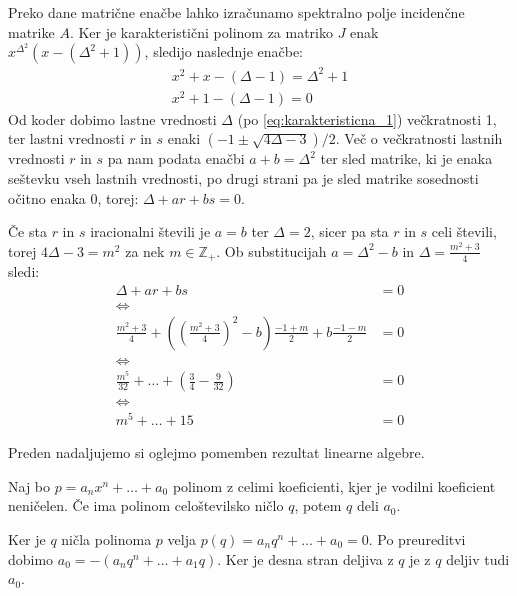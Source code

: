 \documentclass[fin1, tisk]{fmfdelo}
\newcommand{\ZZ}{\mathbb{Z}}
\begin{document}
Preko dane matrične enačbe lahko izračunamo spektralno polje incidenčne 
matrike $A$. Ker je karakteristični polinom za matriko $J$ enak 
$x^{\Delta^2}(x - (\Delta^2 + 1))$, sledijo naslednje enačbe:
\begin{align}
x^2 + x - (\Delta - 1) = \Delta^2 + 1 \label{eq:karakteristicna_1}\\ 
x^2 + 1 - (\Delta - 1) = 0 \label{eq:karakteristicna_2}
\end{align} 
Od koder dobimo lastne vrednosti $\Delta$ (po \eqref{eq:karakteristicna_1})
večkratnosti 1, ter lastni vrednosti $r$ in $s$ enaki 
$(-1 \pm \sqrt{4\Delta - 3})/2$. Več o večkratnosti lastnih vrednosti 
$r$ in $s$ pa nam podata enačbi $a + b = \Delta^2$ ter sled matrike, ki 
je enaka seštevku vseh lastnih vrednosti, po drugi strani pa 
je sled matrike sosednosti očitno enaka 0, torej: 
$\Delta + a r + b s = 0$. 

Če sta $r$ in $s$ iracionalni števili je $a = b$ ter $\Delta = 2$, 
sicer pa sta $r$ in $s$ celi števili, torej $4\Delta - 3 = m^2$ za nek 
$m \in \ZZ_+$. Ob substitucijah $a = \Delta^2 - b$ in 
$\Delta = \frac{m^2 + 3}{4}$ sledi:
\begin{align}
\Delta + a r + b s &= 0 \\
\Leftrightarrow \\
\frac{m^2 + 3}{4} + \left(\left(\frac{m^2 + 3}{4}\right)^2 - b\right) 
\frac{-1 + m}{2} + b \frac{-1 - m}{2} &= 0 \\
\Leftrightarrow \\
\frac{m^5}{32} + \ldots + \left(\frac{3}{4} - \frac{9}{32}\right)  &= 0\\
\Leftrightarrow \\
m^5 + \ldots + 15 &= 0
\end{align}

Preden nadaljujemo si oglejmo pomemben rezultat linearne algebre.

\begin{izrek}
Naj bo $p = a_n x^n + \ldots + a_0$ polinom z celimi koeficienti, kjer 
je vodilni koeficient neničelen. Če ima polinom celoštevilsko ničlo $q$,
potem $q$ deli $a_0$.
\end{izrek}

\begin{dokaz}
Ker je $q$ ničla polinoma $p$ velja $p(q) = a_n q^n + \ldots + 
a_0 = 0$. Po preureditvi dobimo $a_0 = -(a_n q^n + \ldots + a_1 q)$.
Ker je desna stran deljiva z $q$ je z $q$ deljiv tudi $a_0$.
\end{dokaz}
\end{document}
